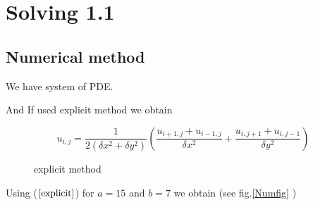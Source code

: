 

\section*{Solving 1.1}

\subsection*{Numerical method}
We have system of PDE.

And If used explicit method we obtain

\begin{equation}\label{explicit}
    u_{i, j} = \frac{1}{2(\delta x^2 + \delta y^2)} \left(\frac{u_{i+1,j} + u_{i-1,j}}{\delta x^2} + \frac{u_{i,j+1} + u_{i,j-1}}{\delta y^2}\right)
\end{equation}

\begin{figure}[h!]
\caption{explicit method}
\end{figure}

Using ($\ref{explicit}$)  for $a=15$ and $b=7$ we obtain (see fig.\ref{Numfig} )

